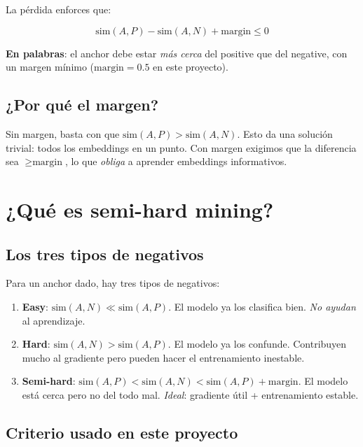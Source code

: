 La pérdida enforces que:

\begin{equation}
  \text{sim}(A, P) - \text{sim}(A, N) + \text{margin} \leq 0
  \label{eq:triplet}
\end{equation}

\noindent\textbf{En palabras}: el anchor debe estar \emph{más
cerca} del positive que del negative, con un margen mínimo
($\text{margin} = 0.5$ en este proyecto).

\subsection{¿Por qué el margen?}

Sin margen, basta con que $\text{sim}(A, P) > \text{sim}(A, N)$.
Esto da una solución trivial: todos los embeddings en un punto.
Con margen exigimos que la diferencia sea $\geq \text{margin}$,
lo que \emph{obliga} a aprender embeddings informativos.

\section{¿Qué es semi-hard mining?}

\subsection{Los tres tipos de negativos}

Para un anchor dado, hay tres tipos de negativos:

\begin{enumerate}
  \item \textbf{Easy}: $\text{sim}(A, N) \ll \text{sim}(A, P)$.
        El modelo ya los clasifica bien. \emph{No ayudan} al
        aprendizaje.
  \item \textbf{Hard}: $\text{sim}(A, N) > \text{sim}(A, P)$.
        El modelo ya los confunde. Contribuyen mucho al
        gradiente pero pueden hacer el entrenamiento inestable.
  \item \textbf{Semi-hard}: $\text{sim}(A, P) < \text{sim}(A, N)
        < \text{sim}(A, P) + \text{margin}$. El modelo está
        cerca pero no del todo mal. \emph{Ideal}: gradiente
        útil + entrenamiento estable.
\end{enumerate}

\subsection{Criterio usado en este proyecto}

